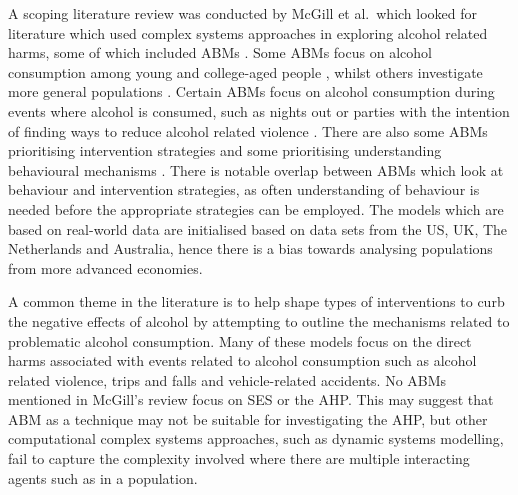 A scoping literature review was conducted by McGill et al.~which looked for literature which used complex systems approaches in exploring alcohol related harms, some of which included \ac{ABM}s \cite{scopingReview}. Some \ac{ABM}s focus on alcohol consumption among young and college-aged people \cite{collegeABMCLD, abmCollegeConsumption, abmCollegePolicyandMechanisms, abmYoungAus, abmNetLogo}, whilst others investigate more general populations \cite{abmBinge, abmAlcoholTaxation, abmDutchAdults, abmDrinkingBehaviour, abmEcologicalNiche, abmTradingHours, abmPublicTransport}. 
Certain \ac{ABM}s focus on alcohol consumption during events where alcohol is consumed, such as nights out or parties with the intention of finding ways to reduce alcohol related violence \cite{abmVenueLock, abmPublicTransport, abmAlcoholCrime, abmSimARC, abmDrinkingBehaviour, abmEcologicalNiche, abmTradingHours, abmRiskBehaviourDev}. There are also some \ac{ABM}s prioritising intervention strategies \cite{collegeABMCLD, abmVenueLock, abmPublicTransport, abmNetLogo, abmPolicyInterventions, abmCollegePolicyandMechanisms, abmAlcoholTaxation, abmDrinkingBehaviour} and some prioritising understanding behavioural mechanisms \cite{collegeABMCLD, abmRiskBehaviourDev, abmYoungAus, abmCollegeConsumption, abmCollegePolicyandMechanisms, abmAlcoholCrime, abmBinge, abmSimARC, abmDutchAdults, abmDrinkingBehaviour, abmEcologicalNiche}. There is notable overlap between \ac{ABM}s which look at behaviour and intervention strategies, as often understanding of behaviour is needed before the appropriate strategies can be employed. The models which are based on real-world data are initialised based on data sets from the US, UK, The Netherlands and Australia, hence there is a bias towards analysing populations from more advanced economies.

A common theme in the literature  is to help shape types of interventions to curb the negative effects of alcohol by attempting to outline the mechanisms related to problematic alcohol consumption. Many of these models focus on the direct harms associated with events related to alcohol consumption such as alcohol related violence, trips and falls and vehicle-related accidents. No \ac{ABM}s mentioned in McGill's review focus on \ac{SES} or the \ac{AHP}. This may suggest that \ac{ABM} as a technique may not be suitable for investigating the \ac{AHP}, but other computational complex systems approaches, such as dynamic systems modelling, fail to capture the complexity involved where there are multiple interacting agents such as in a population. 

